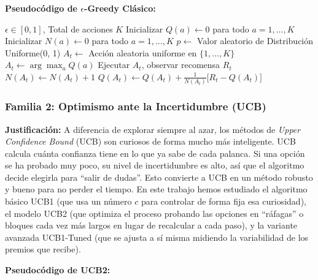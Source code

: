 \textbf{Pseudocódigo de \(\epsilon\)-Greedy Clásico:}

\begin{algorithm}
\caption{Algoritmo $\epsilon$-Greedy para K-Brazos}
\begin{algorithmic}[1]
\REQUIRE $\epsilon \in [0, 1]$, Total de acciones $K$
\STATE Inicializar $Q(a) \leftarrow 0$ para todo $a=1,\dots, K$
\STATE Inicializar $N(a) \leftarrow 0$ para todo $a=1,\dots, K$
    \STATE $p \leftarrow$ Valor aleatorio de Distribución Uniforme(0, 1)
        \STATE $A_t \leftarrow$ Acción aleatoria uniforme en $\{1, \dots, K\}$
    \ELSE
        \STATE $A_t \leftarrow \arg\max_a Q(a)$  
    \ENDIF
    \STATE Ejecutar $A_t$, observar recomensa $R_t$
    \STATE $N(A_t) \leftarrow N(A_t) + 1$
    \STATE $Q(A_t) \leftarrow Q(A_t) + \frac{1}{N(A_t)} \big[R_t - Q(A_t)\big]$
\ENDFOR
\end{algorithmic}
\end{algorithm}

\subsubsection{Familia 2: Optimismo ante la Incertidumbre
(UCB)}\label{familia-2-optimismo-ante-la-incertidumbre-ucb}

\textbf{Justificación:} A diferencia de explorar siempre al azar, los
métodos de \emph{Upper Confidence Bound} (UCB) son curiosos de forma
mucho más inteligente. UCB calcula cuánta confianza tiene en lo que ya
sabe de cada palanca. Si una opción se ha probado muy poco, su nivel de
incertidumbre es alto, así que el algoritmo decide elegirla para ``salir
de dudas''. Esto convierte a UCB en un método robusto y bueno para no
perder el tiempo. En este trabajo hemos estudiado el algoritmo básico
UCB1 (que usa un número \(c\) para controlar de forma fija esa
curiosidad), el modelo UCB2 (que optimiza el proceso probando las
opciones en ``ráfagas'' o bloques cada vez más largos en lugar de
recalcular a cada paso), y la variante avanzada UCB1-Tuned (que se
ajusta a sí misma midiendo la variabilidad de los premios que recibe).

\textbf{Pseudocódigo de UCB2:}

